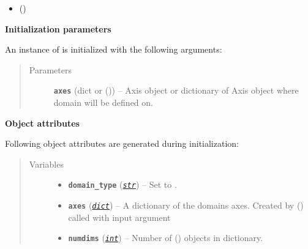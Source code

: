 \documentclass[a4paper,10pt,english]{sphinxmanual}
\begin{document}
\begin{fulllineitems}
\begin{itemize}
\item {} 
{\hyperref[api/climlab.domain:climlab.domain.domain.box_model_domain]{\emph{}}} ()

\end{itemize}

\textbf{Initialization parameters}

An instance of  is initialized with the following 
arguments:
\begin{quote}\begin{description}
\item[{Parameters}] \leavevmode
\textbf{\texttt{axes}} (dict or {\hyperref[api/climlab.domain:climlab.domain.axis.Axis]{\emph{}}} ()) -- Axis object or dictionary of Axis object where domain will
be defined on.

\end{description}\end{quote}

\textbf{Object attributes}

Following object attributes are generated during initialization:
\begin{quote}\begin{description}
\item[{Variables}] \leavevmode\begin{itemize}
\item {} 
\textbf{\texttt{domain\_type}} (\href{http://docs.python.org/2.7/library/functions.html\#str}{\emph{\texttt{str}}}) -- Set to .

\item {} 
\textbf{\texttt{axes}} (\href{http://docs.python.org/2.7/library/stdtypes.html\#dict}{\emph{\texttt{dict}}}) -- A dictionary of the domains axes. Created by
{\hyperref[api/climlab.domain:climlab.domain.domain._Domain._make_axes_dict]{\emph{}}} () called with input 
argument 

\item {} 
\textbf{\texttt{numdims}} (\href{http://docs.python.org/2.7/library/functions.html\#int}{\emph{\texttt{int}}}) -- Number of {\hyperref[api/climlab.domain:climlab.domain.axis.Axis]{\emph{}}} () objects
in  dictionary.


\end{itemize}
\end{description}
\end{quote}
\end{fulllineitems}
\end{document}
